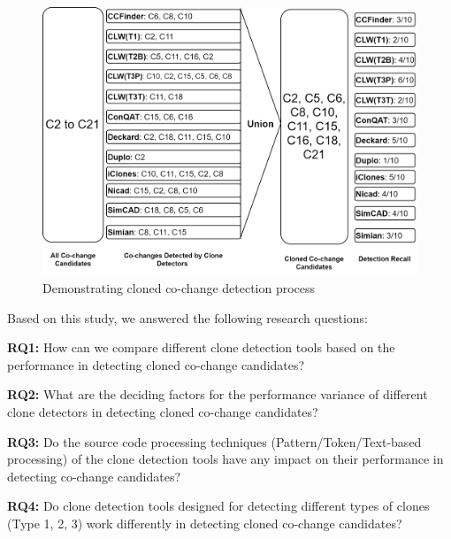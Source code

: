 \documentclass[review]{elsarticle}
\begin{document}

\vspace{4mm}
\begin{figure}
\centering
\includegraphics[width=\columnwidth] {CalculatingCC.png}
\caption{Demonstrating cloned co-change detection process}
\label{fig:CalculatingCC}
\end{figure}

Based on this study, we answered the following research questions:

\vspace{0.15cm}
\noindent
\textbf{RQ1: }How can we compare different clone detection tools based on the performance in detecting cloned co-change candidates? 
 
\vspace{0.15cm}
\noindent
\textbf{RQ2: }What are the deciding factors for the performance variance of different clone detectors in detecting cloned co-change candidates?

\vspace{0.15cm}
\noindent
\textbf{RQ3: }Do the source code processing techniques (Pattern/Token/Text-based processing) of the clone detection tools have any impact on their performance in detecting co-change candidates?

\vspace{0.15cm}
\noindent
\textbf{RQ4: }Do clone detection tools designed for detecting different types of clones (Type 1, 2, 3) work differently in detecting cloned co-change candidates?
\end{document}
